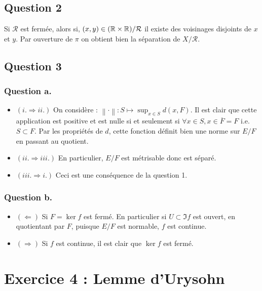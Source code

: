 \documentclass{cours}
\begin{document}
    \subsection{Question 2}
        Si $\mathcal{R}$ est fermée, alors si, $(x, y) \in (\mathbb{R} \times \mathbb{R})/\mathcal{R}$ il existe des voisinages disjoints de $x$ et $y$. Par ouverture de $\pi$ on obtient bien la séparation de $X/\mathcal{R}$.

    \subsection{Question 3}
        \subsubsection{Question a.}
            \begin{itemize}
                \item $(i. \Rightarrow ii.)$  On considère : $\left\lVert\cdot\right\rVert : S \mapsto \sup_{x\in S} d(x, F)$. Il est clair que cette application est positive et est nulle si et seulement si $\forall x \in S, x \in \overline{F} = F$ i.e. $S \subset F$. Par les propriétés de $d$, cette fonction définit bien une norme sur $E/F$ en passant au quotient. 
                \item $(ii. \Rightarrow iii.)$ En particulier, $E/F$ est métrisable donc est séparé. 
                \item $(iii. \Rightarrow i.)$ Ceci est une conséquence de la question 1. 
            \end{itemize}

        \subsubsection{Question b.}
            \begin{itemize}
                \item $(\Leftarrow)$ Si $F = \ker f$ est fermé. En particulier si $U \subset \Im f$ est ouvert, en quotientant par $F$, puisque $E/F$ est normable, $f$ est continue. 
                \item $(\Rightarrow)$ Si $f$ est continue, il est clair que $\ker f$ est fermé. 
            \end{itemize}

\section{Exercice 4 : Lemme d'Urysohn}
\end{document}
